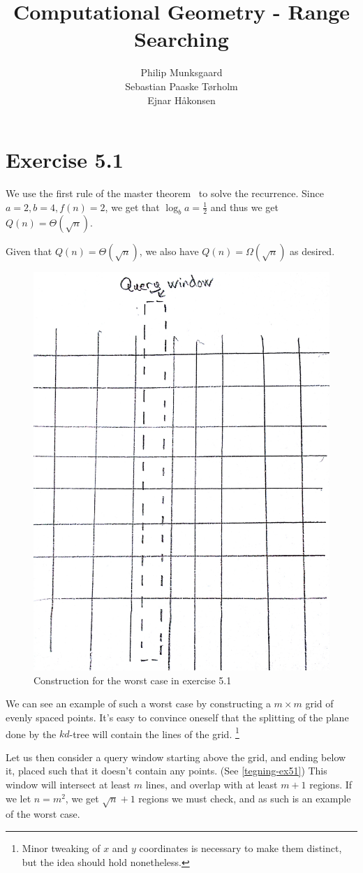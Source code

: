\documentclass[11pt,a4paper]{article}
\title{Computational Geometry - Range Searching}
\author{Philip Munksgaard \\ Sebastian Paaske Tørholm \\ Ejnar Håkonsen}
\begin{document}
\maketitle

\section{Exercise 5.1}

We use the first rule of the master theorem~\cite{Cormen theorem 4.1}
to solve the recurrence. Since $a=2, b=4, f(n)=2$, we get that $\log_b a
= \frac{1}{2}$ and thus we get $Q(n) = \Theta(\sqrt{n})$.

Given that $Q(n) = \Theta(\sqrt{n})$, we also have $Q(n) = \Omega(\sqrt{n})$
as desired.

\begin{figure}[h!]
    \centering
    \includegraphics[width=.6\textwidth]{tegning-ex51.jpg}
    \caption{Construction for the worst case in exercise 5.1}
    \label{tegning-ex51}
\end{figure}

We can see an example of such a worst case by constructing a $m \times m$ grid
of evenly spaced points. It's easy to convince oneself that the splitting of
the plane done by the $kd$-tree will contain the lines of the grid.
\footnote{Minor tweaking of $x$ and $y$ coordinates is necessary to make
them distinct, but the idea should hold nonetheless.}

Let us then consider a query window starting above the grid, and ending below it,
placed such that it doesn't contain any points. (See \autoref{tegning-ex51})
This window will intersect at least $m$ lines, and overlap with at least $m+1$
regions. If we let $n = m^2$, we get $\sqrt{n}+1$ regions we must check, and
as such is an example of the worst case.
\end{document}
